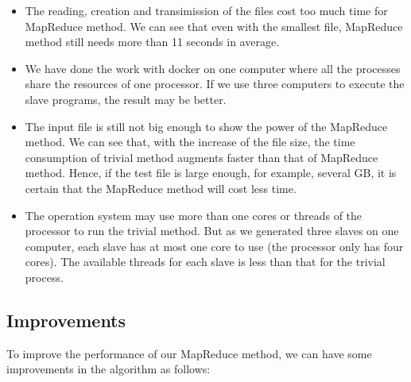 \documentclass[a4paper,14pt,UTF8]{article}
\begin{document}
		
		\begin{itemize}
			
			\item 
			The reading, creation and transimission of the files cost too much time for MapReduce method. We can see that even with the smallest  file, MapReduce method  still needs more than 11 seconds in average. \\
			
			\item 
			We have done the work with docker on one computer where all the processes share the resources of one processor. If we use three computers to execute the slave programs, the result may be better.  \\
			
			\item 
			The input file is still not big enough to show the power of the MapReduce method. We can see that, with the increase of the file size, the time consumption of trivial method augments faster than that of MapReduce method. Hence, if the test file is large enough, for example, several GB, it is certain that the MapReduce method will cost less time. \\
			
			\item
			The operation system may use more than one cores or threads of the processor to run the trivial method. But as we generated three slaves on one computer, each slave has at most one core to use (the processor only has four cores). The available threads for each slave is less than that for the trivial process. \\
			
		\end{itemize}	

	
	\subsection{Improvements}
	
	To improve the performance of our MapReduce method, we can have some improvements in the algorithm as follows:
	
\end{document}
